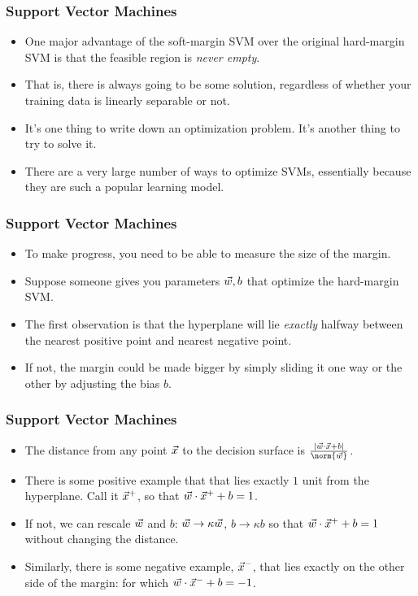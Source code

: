 \documentclass[trans,aspectratio=169]{beamer}
\begin{document}
\begin{frame}
  \frametitle{Support Vector Machines}
\begin{itemize} 
\item 
One major advantage of the soft-margin SVM over the original
hard-margin SVM is that the feasible region is \emph{never empty}.
\item That is, there is always going to be some solution, regardless of
whether your training data is linearly separable or not.
\item 
It's one thing to write down an optimization problem.  It's another
thing to try to solve it.
\item   There are a very large number of ways to
optimize SVMs, essentially because they are such a popular learning
model.
\end{itemize}
\end{frame}
\begin{frame}
  \frametitle{Support Vector Machines}
\begin{itemize}
\item 
To make progress, you need to be able to measure the size of the
margin. 
\item Suppose someone gives you parameters ${\vec w},b$ that optimize
the hard-margin SVM.  
\item 
The
first observation is that the hyperplane will lie \emph{exactly}
halfway between the nearest positive point and nearest negative point.
\item If not, the margin could be made bigger by simply sliding it one way
or the other by adjusting the bias $b$.
\end{itemize}
\end{frame}
\begin{frame}
  \frametitle{Support Vector Machines}
\begin{itemize}
\item The distance from any point ${\vec x}$ to the decision surface is $\frac{|\dotp{\vw}{\vx}+b|}{\norm{\vw}}$.
\item 
There is some positive example that that lies
exactly $1$ unit from the hyperplane.  Call it ${\vec x}^+$, so that
${\vec w} \cdot {\vec x}^++b = 1$.
\item If not, we can rescale ${\vec w}$ and $b$: ${\vec w}\rightarrow \kappa{\vec w}$, $b\rightarrow \kappa b$
so that ${\vec w} \cdot {\vec x}^++b = 1$ without changing the distance.
\item  Similarly, there is some negative example,
${\vec x}^-$, that lies exactly on the other side of the margin: for which
${\vec w} \cdot {\vec x}^-+b = -1$. 
\end{itemize}
\end{frame}
\end{document}
